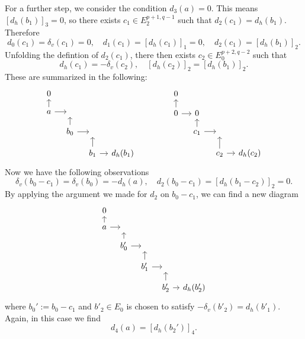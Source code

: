 \begin{remark}
For a further step, we consider the condition $d_3(a)=0$. This means $[d_h(b_1)]_3=0$, so there exists $c_1\in E^{p+1,q-1}_2$ such that $d_2(c_1)=d_h(b_1)$. Therefore
\[d_0(c_1)=\delta_v(c_1)=0,\quad d_1(c_1)=[d_h(c_1)]_1=0,\quad d_2(c_1)=[d_h(b_1)]_2.\]
Unfolding the defintion of $d_2(c_1)$, there then exists $c_2\in E_0^{p+2,q-2}$ such that
\[d_h(c_1)=-\delta_v(c_2),\quad [d_h(c_2)]_2=[d_h(b_1)]_2.\]
These are summarized in the following:
\[\begin{tikzcd}[column sep=1.0 em,row sep=1.0 em]
0&&&\\
a\ar[u]\ar[r]&{}&{}&\\
{}&b_0\ar[u]\ar[r]&{}&\\
{}&{}&b_1\ar[u]\ar[r]&d_h(b_1)
\end{tikzcd}\quad\quad\quad\quad
\begin{tikzcd}[column sep=1.0 em,row sep=1.0 em]
0&&&\\
0\ar[u]\ar[r]&0&{}&\\
{}&c_1\ar[u]\ar[r]&{}&\\
{}&{}&c_2\ar[u]\ar[r]&d_h(c_2)
\end{tikzcd}\]
Now we have the following observations
\[\delta_v(b_0-c_1)=\delta_v(b_0)=-d_h(a),\quad d_2(b_0-c_1)=[d_h(b_1-c_2)]_2=0.\]
By applying the argument we made for $d_2$ on $b_0-c_1$, we can find a new diagram
\[\begin{tikzcd}[column sep=0.8 em,row sep=0.8 em]
0&&&\\
a\ar[u]\ar[r]&{}&{}&{}&{}\\
{}&b'_0\ar[u]\ar[r]&{}&{}&{}\\
{}&{}&b'_1\ar[u]\ar[r]&{}&{}\\
{}&{}&&b'_2\ar[u]\ar[r]&d_h(b'_2)
\end{tikzcd}\]
where $b_0':=b_0-c_1$ and $b'_2\in E_0$ is chosen to satisfy $-\delta_v(b'_2)=d_h(b'_1)$. Again, in this case we find
\[d_4(a)=[d_h(b_2')]_4.\]


\end{remark}
